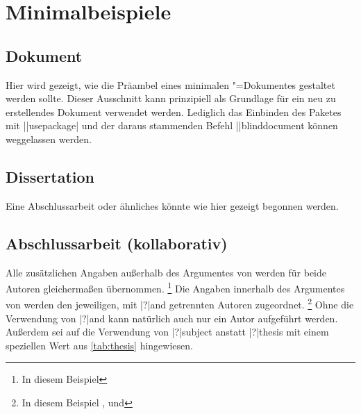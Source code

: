 \chapter{%
  Minimalbeispiele%
  \label{sec:exmpl}%
}
\section{%
  Dokument%
}
%
Hier wird gezeigt, wie die Präambel eines minimalen "=Dokumentes 
gestaltet werden sollte. Dieser Ausschnitt kann prinzipiell als Grundlage für 
ein neu zu erstellendes Dokument verwendet werden. Lediglich das Einbinden des 
Paketes  mit \Macro||{usepackage|} und 
der daraus stammenden Befehl \Macro||{blinddocument} können weggelassen werden.



\section{%
  Dissertation%
  \label{sec:exmpl:dissertation}%
}
%
Eine Abschlussarbeit oder ähnliches könnte wie hier gezeigt begonnen werden.



\section{%
  Abschlussarbeit (kollaborativ)%
  \label{sec:exmpl:thesis}%
}
%
Alle zusätzlichen Angaben außerhalb des Argumentes von  werden 
für beide Autoren gleichermaßen übernommen.%
\footnote{In diesem Beispiel }
Die Angaben innerhalb des Argumentes von  werden den jeweiligen, 
mit \Macro|?|{and} getrennten Autoren zugeordnet.%
\footnote{%
  In diesem Beispiel ,  und 
}
Ohne die Verwendung von \Macro|?|{and} kann natürlich auch nur ein Autor 
aufgeführt werden. Außerdem sei auf die Verwendung von \Macro|?|{subject} 
anstatt \Macro|?|{thesis} mit einem speziellen Wert aus \autoref{tab:thesis} 
hingewiesen.



